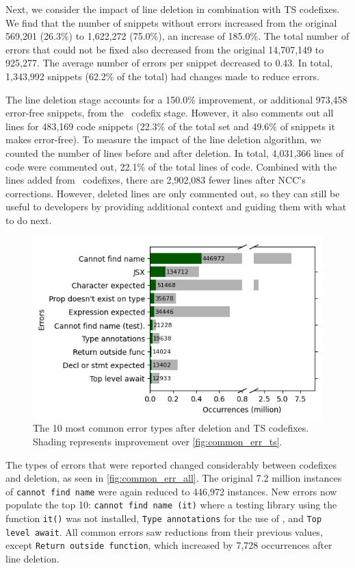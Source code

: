 \documentclass[conference]{IEEEtran}
\begin{document}
Next, we consider the impact of line deletion in combination with TS codefixes. We find that the number of snippets without errors increased from the original 569,201 (26.3\%) to 1,622,272 (75.0\%), an increase of 185.0\%. The total number of errors that could not be fixed also decreased from the original 14,707,149 to 925,277. The average number of errors per snippet decreased to 0.43. In total, 1,343,992 snippets (62.2\% of the total) had changes made to reduce errors. 

The line deletion stage accounts for a 150.0\% improvement, or additional 973,458 error-free snippets, from the \ts\ codefix stage. However, it also comments out all lines for 483,169 code snippets (22.3\% of the total set and 49.6\% of snippets it makes error-free). To measure the impact of the line deletion algorithm, we counted the number of lines before and after deletion. In total, 4,031,366 lines of code were commented out, 22.1\% of the total lines of code. Combined with the lines added from \ts\ codefixes, there are 2,902,083 fewer lines after NCC's corrections. However, deleted lines are only commented out, so they can still be useful to developers by providing additional context and guiding them with what to do next.

\begin{figure}[h]
    \centering
    \includegraphics[width=0.8\linewidth]{images/commonErrorTypesAllFixes.png}
    \caption{The 10 most common error types after deletion and TS codefixes. Shading represents improvement over \autoref{fig:common_err_ts}.}
    \label{fig:common_err_all}
\end{figure}

The types of errors that were reported changed considerably between codefixes and deletion, as seen in \autoref{fig:common_err_all}. The original 7.2 million instances of \texttt{cannot find name} were again reduced to 446,972 instances. New errors now populate the top 10: \texttt{cannot find name (it)} where a testing library using the function \texttt{it()} was not installed, \texttt{Type annotations} for the use of \ts, and \texttt{Top level await}. All common errors saw reductions from their previous values, except \texttt{Return outside function}, which increased by 7,728 occurrences after line deletion.
\end{document}
